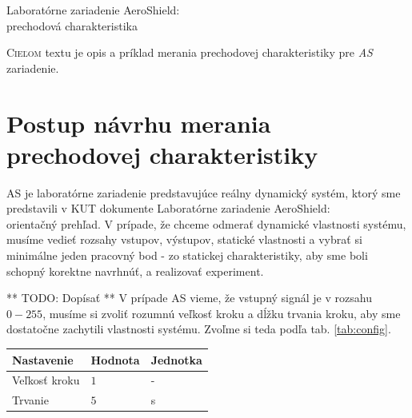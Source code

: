\documentclass[a4paper, 10pt, ]{article}
\begin{document}
\begin{flushleft}
    Laboratórne zariadenie AeroShield:\\ prechodová charakteristika
\end{flushleft}

\bigskip

\normalsize
\normalfont

\lstset{style=mystyle}










\noindent
\lettrine[lines=1, nindent=1pt, loversize=0.0]{C}{ieľom}
textu je opis a príklad merania prechodovej charakteristiky pre \emph{AS} zariadenie.


\section{Postup návrhu merania prechodovej charakteristiky}
AS je laboratórne zariadenie predstavujúce reálny dynamický systém, ktorý sme predstavili v KUT dokumente Laboratórne zariadenie AeroShield:\\ orientačný prehľad. V prípade, že chceme odmerať dynamické vlastnosti systému, musíme vedieť rozsahy vstupov, výstupov, statické vlastnosti a vybrať si minimálne jeden pracovný bod - zo statickej charakteristiky, aby sme boli schopný korektne navrhnúť, a realizovať experiment.

** TODO: Dopísať **
V prípade AS vieme, že vstupný signál je v rozsahu $0 - 255$, musíme si zvoliť rozumnú veľkosť kroku a dĺžku trvania kroku, aby sme dostatočne zachytili vlastnosti systému. Zvoľme si teda podľa tab. \ref{tab:config}.

\begin{center}

    \vspace{-10pt}

    \label{tab:config}

    \lstyle

    \begin{tabular*}{\textwidth}{@{ \extracolsep{\fill}} lll}
        \toprule
        Nastavenie & Hodnota & Jednotka \\
        \midrule
        Veľkosť kroku & $1$ & - \\
        Trvanie & $5$ & s \\
        \bottomrule
    \end{tabular*}

\end{center}
\end{document}
